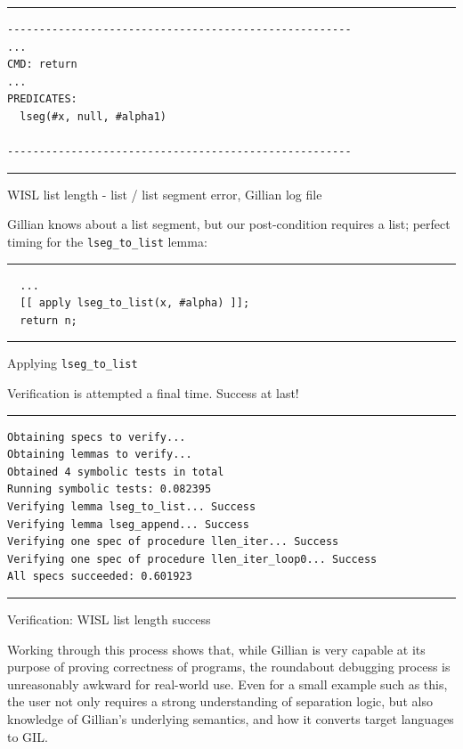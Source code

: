 \begin{listing}[!ht]
\noindent\rule{\textwidth}{0.5pt}
\vspace{-0.6cm}
\begin{verbatim}
------------------------------------------------------
...
CMD: return
...
PREDICATES:
  lseg(#x, null, #alpha1)

------------------------------------------------------
\end{verbatim}
\vspace{-0.4cm}
\noindent\rule{\textwidth}{0.5pt}
\vspace{-0.6cm}
\caption{WISL list length - list / list segment error, Gillian log file}
\end{listing}

Gillian knows about a list segment, but our post-condition requires a list;
perfect timing for the \texttt{lseg\_to\_list} lemma:

\begin{listing}[!ht]
\noindent\rule{\textwidth}{0.5pt}
\vspace{-0.6cm}
\begin{verbatim}
  ...
  [[ apply lseg_to_list(x, #alpha) ]];
  return n;
\end{verbatim}
\vspace{-0.4cm}
\noindent\rule{\textwidth}{0.5pt}
\vspace{-0.6cm}
\caption{Applying \texttt{lseg\_to\_list}}
\end{listing}

Verification is attempted a final time. Success at last!

\begin{listing}[!ht]
\noindent\rule{\textwidth}{0.5pt}
\vspace{-0.6cm}
\begin{verbatim}
Obtaining specs to verify...
Obtaining lemmas to verify...
Obtained 4 symbolic tests in total
Running symbolic tests: 0.082395
Verifying lemma lseg_to_list... Success
Verifying lemma lseg_append... Success
Verifying one spec of procedure llen_iter... Success
Verifying one spec of procedure llen_iter_loop0... Success
All specs succeeded: 0.601923
\end{verbatim}
\vspace{-0.4cm}
\noindent\rule{\textwidth}{0.5pt}
\vspace{-0.6cm}
\caption{Verification: WISL list length success}
\end{listing}

Working through this process shows that, while Gillian is very capable at its
purpose of proving correctness of programs, the roundabout debugging process is
unreasonably awkward for real-world use. Even for a small example such as this,
the user not only requires a strong understanding of separation logic, but also
knowledge of Gillian's underlying semantics, and how it converts target
languages to GIL.\@

